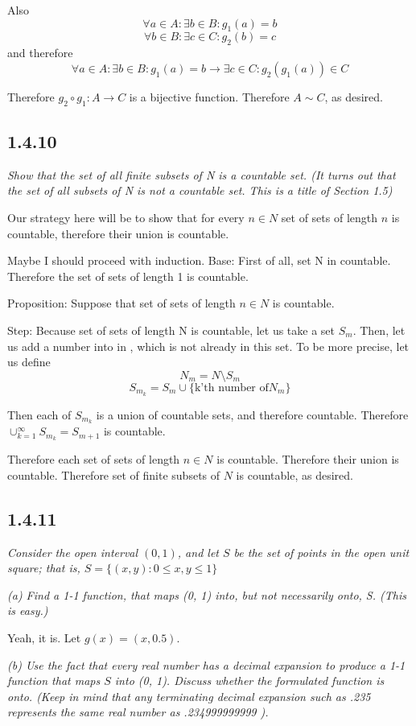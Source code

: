 \documentclass[11pt,oneside,titlepage]{book}
\begin{document}
Also
$$\forall a \in A: \exists b \in B: g_1(a) = b$$
$$\forall b \in B: \exists c \in C: g_2(b) = c$$
and therefore
$$\forall a \in A: \exists b \in B: g_1(a) = b \to  \exists c \in C: g_2(g_1(a)) \in C $$

Therefore $g_2 \circ g_1: A \to C$ is a bijective function. Therefore $A \sim C$, as desired.

\subsection*{1.4.10}
\textit{Show that the set of all finite subsets of N is a countable set. (It turns out that
  the set of all subsets of N is not a countable set. This is a title of Section 1.5)}

Our strategy here will be to show that for every $n \in N$ set of sets of
length $n$ is countable, therefore their union is countable.

Maybe I should proceed with induction.
Base: 
First of all, set N in countable.  Therefore the set of sets of length 1 is countable.

Proposition:
Suppose that set of sets of length $n \in N$ is countable.

Step:
Because set of sets of length N is countable, let us take a set $S_m$.
Then, let us add a number into in , which is not already in this set.
To be more precise, let us define
$$N_m = N \setminus S_m$$
$$S_{m_k} = S_m\cup \{\text{k'th number of}N_m\}$$

Then each of $S_{m_k}$ is a union of countable sets, and therefore countable.
Therefore $\cup^{\infty}_{k = 1} S_{m_k} = S_{m + 1}$ is countable.

Therefore each set of sets of length $n \in N$ is countable. Therefore their union is
countable. Therefore set of finite subsets of $N$ is countable, as desired.

\subsection*{1.4.11}
\textit{Consider the open interval $(0,1)$, and let $S$ be the set of points in the
  open unit square; that is, $S = \{(x, y): 0 \leq x,y \leq 1\}$}

\textit{(a) Find a 1-1 function, that maps (0, 1) into, but not necessarily onto, S.
  (This is easy.)}

Yeah, it is. Let $g(x) = (x, 0.5)$.

\textit{(b) Use the fact that every real number has a decimal expansion to produce a
  1-1 function that maps $S$ into (0, 1). Discuss whether the formulated function is onto.
  (Keep in mind that any terminating decimal expansion such as .235 represents the same
  real number as .234999999999 ).}
\end{document}
